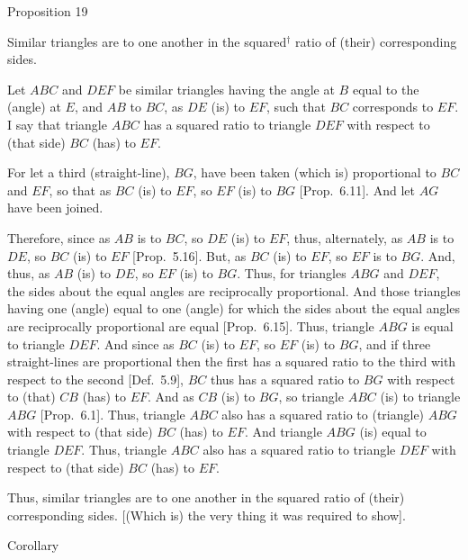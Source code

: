 \begin{center}
{\large Proposition 19}
\end{center}

Similar triangles are to one another in the squared$^\dag$
ratio of (their) corresponding sides.

\epsfysize=1.4in
\centerline{}

Let $ABC$ and $DEF$ be similar triangles having the angle at $B$ equal to
the (angle)  at $E$, and $AB$  to $BC$, as $DE$ (is) to $EF$, such that
$BC$ corresponds to $EF$. I say that triangle $ABC$ has a
squared ratio to triangle $DEF$ with respect to (that side) $BC$ (has) to $EF$.

For let a third (straight-line), $BG$, have been taken (which is)
proportional to $BC$ and $EF$,  so that as $BC$ (is) to $EF$, so $EF$ (is)
to $BG$ [Prop.~6.11]. And let $AG$
have been joined.

Therefore, since as $AB$ is to $BC$, so $DE$ (is) to $EF$, thus, alternately, 
as $AB$ is to $DE$, so $BC$ (is) to $EF$ [Prop.~5.16].
But, as $BC$ (is) to $EF$, so $EF$ is to $BG$. And, thus, as $AB$ (is) to $DE$,
so $EF$ (is) to $BG$. Thus, for triangles $ABG$ and $DEF$, the sides
about the equal angles are reciprocally proportional. And those triangles
 having one (angle) equal to one (angle) for which the sides
about the equal angles are reciprocally proportional are equal [Prop.~6.15]. Thus, triangle
$ABG$ is equal to triangle $DEF$. And since as $BC$ (is) to $EF$, so
$EF$ (is) to $BG$, and if three straight-lines are proportional then the
first has a squared ratio to the third with respect to the second  [Def.~5.9],  $BC$ thus has a squared ratio to $BG$ with
respect to  (that) $CB$ (has) to $EF$.  And as $CB$ (is) to
$BG$, so triangle $ABC$ (is) to triangle $ABG$ [Prop.~6.1].  Thus, triangle $ABC$ also has a squared
ratio to (triangle) $ABG$ with respect to (that side) $BC$ (has) to $EF$. And triangle
$ABG$ (is) equal to triangle $DEF$. Thus, triangle $ABC$ also
has a squared ratio to triangle $DEF$ with respect to (that side) $BC$ (has) to $EF$.

Thus, similar triangles are to one another in the squared
ratio of  (their) corresponding sides. [(Which is) the very thing it was required
to show].\\

\begin{center}
{\large Corollary}
\end{center}\vspace*{-7pt}

